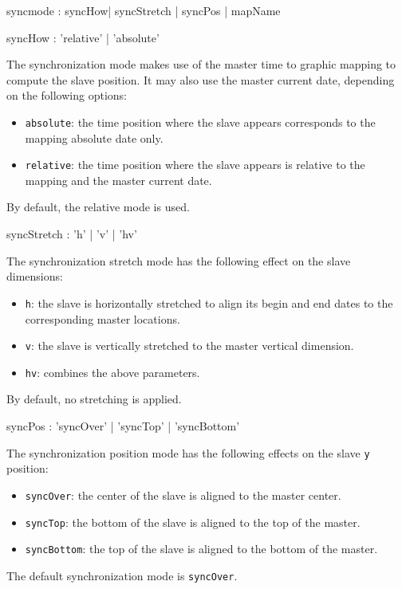 \documentclass[a4paper,twoside]{report}
\newcommand{\OSC}[1]		{\texttt{#1}}
\newcommand{\values}[1]	{\texttt{#1}}
\begin{document}
\begin{rail}
syncmode : syncHow| syncStretch | syncPos | mapName
\end{rail}

\begin{rail}
syncHow : 'relative' | 'absolute'
\end{rail}

The synchronization mode makes use of the master time to graphic mapping to compute the slave position. It may also use the master current date, depending on the following options:
\begin{itemize}
\item \OSC{absolute}: the time position where the slave appears corresponds to the mapping absolute date only.
\item \OSC{relative}: the time position where the slave appears is relative to the mapping and the master current date.
\end{itemize}
By default, the relative mode is used.

\begin{rail}
syncStretch : 'h' | 'v' | 'hv'
\end{rail}

The synchronization stretch mode has the following effect on the slave dimensions:
\begin{itemize}
\item \OSC{h}: the slave is horizontally stretched to align its begin and end dates to the corresponding master locations.
\item \OSC{v}: the slave is vertically stretched to the master vertical dimension.
\item \OSC{hv}: combines the above parameters.
\end{itemize}
By default, no stretching is applied.

\begin{rail}
syncPos : 'syncOver' | 'syncTop' | 'syncBottom'
\end{rail}

The synchronization position mode has the following effects on the slave \values{y} position:
\begin{itemize}
\item \OSC{syncOver}: the center of the slave is aligned to the master center.
\item \OSC{syncTop}: the bottom of the slave is aligned to the top of the master.
\item \OSC{syncBottom}: the top of the slave is aligned to the bottom of the master.
\end{itemize}
The default synchronization mode is \OSC{syncOver}.
\end{document}
